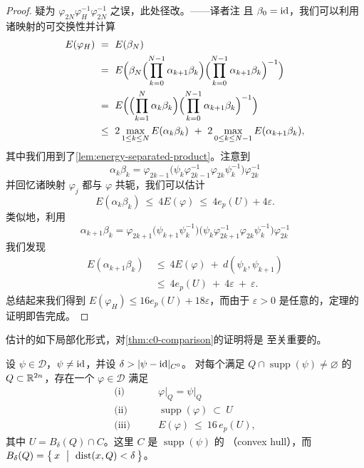 \begin{proof}
{疑为 $\varphi_{2N}\varphi_{H}^{-1}\varphi_{2N}^{-1}$ 之误，此处径改。——译者注}%
且 $\beta_{0}=\mathrm{id}$，我们可以利用诸映射的可交换性并计算
\begin{align*}
E(\varphi_{H})\ &=\ E(\beta_{N})\\
&=\ E\Bigl(\beta_{N}\Bigl(\prod_{k=0}^{N-1}\alpha_{k+1}\beta_{k}\Bigr)\Bigl(\prod_{k=0}^{N-1}\alpha_{k+1}\beta_{k}\Bigr)^{-1}\Bigr)\\
&=\ E\Bigl(\Bigl(\prod_{k=1}^{N}\alpha_{k}\beta_{k}\Bigr)\Bigl(\prod_{k=0}^{N-1}\alpha_{k+1}\beta_{k}\Bigr)^{-1}\Bigr)\\
&\leq\ 2\max_{1\leq k\leq N}E(\alpha_{k}\beta_{k})\ +\ 2\max_{0\leq k\leq N-1}E(\alpha_{k+1}\beta_{k}),
\end{align*}
其中我们用到了\cref{lem:energy-separated-product}。注意到
\[
\alpha_{k}\beta_{k}=\varphi_{2k-1}\bigl(\psi_{k}\varphi_{2k-1}^{-1}\varphi_{2k}\psi_{k}^{-1}\bigr)\varphi_{2k}^{-1}
\]
并回忆诸映射 $\varphi_{j}$ 都与 $\varphi$ 共轭，我们可以估计
\[
E(\alpha_{k}\beta_{k})\ \leq\ 4E(\varphi)\ \leq\ 4e_{p}(U)+4\varepsilon.
\]
类似地，利用
\[
\alpha_{k+1}\beta_{k}=\varphi_{2k+1}\bigl(\psi_{k+1}\psi_{k}^{-1}\bigr)\bigl(\psi_{k}\varphi_{2k+1}^{-1}\varphi_{2k}\psi_{k}^{-1}\bigr)\varphi_{2k}^{-1}
\]
我们发现
\begin{align*}
E(\alpha_{k+1}\beta_{k})\ &\leq\ 4E(\varphi)\ +\ d(\psi_{k},\psi_{k+1})\\
&\leq\ 4e_{p}(U)\ +\ 4\varepsilon\ +\ \varepsilon.
\end{align*}
总结起来我们得到 $E(\varphi_{H})\leq16e_{p}(U)+18\varepsilon$，而由于%
$\varepsilon>0$ 是任意的，\trSikorav{}定理的证明即告完成。
\end{proof}

\trSikorav{}估计的如下局部化形式，对\cref{thm:c0-comparison}的证明将是%
至关重要的。

\begin{lemma}\label{lem:sikorav-localization}
设 $\psi\in\mathcal{D}$，$\psi\neq\mathrm{id}$，并设 $\delta>\lvert\psi-\mathrm{id}\rvert_{C^{0}}$。%
对每个满足 $Q\cap\operatorname{supp}(\psi)\neq\varnothing$ 的\trOpenSet{}%
$Q\subset\mathbb{R}^{2n}$，存在一个 $\varphi\in\mathcal{D}$ 满足
\begin{align*}
\text{(i)}\qquad& \varphi\big|_{Q}=\psi\big|_{Q}\\
\text{(ii)}\qquad& \operatorname{supp}(\varphi)\ \subset\ U\\
\text{(iii)}\qquad& E(\varphi)\ \leq\ 16\,e_{p}(U),
\end{align*}
其中 $U=B_{\delta}(Q)\cap C$。这里 $C$ 是 $\operatorname{supp}(\psi)$ 的%
\textbf{\trConvexHull}（convex hull），而 $B_{\delta}(Q)=\bigl\{\,x\ \bigm|\ %
\operatorname{dist}(x,Q)<\delta\,\bigr\}$。
\end{lemma}

